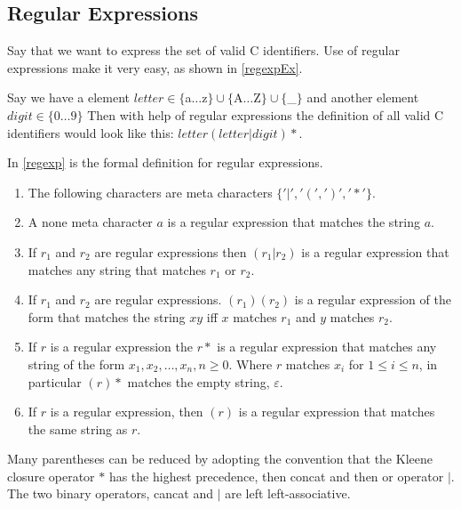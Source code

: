 \subsection{Regular Expressions}
Say that we want to express the set of valid C identifiers. Use of regular 
expressions make it very easy, as shown in \cref{regexpEx}. 
\begin{example}\label{regexpEx}
Say we have a element $letter \in \{$a$ \dots $z$\} \cup \{$A$ \dots $Z$\} \cup 
\{$\_$\}$
and another element $digit \in \{0 \dots 9\}$
Then with help of regular expressions the definition of all valid C identifiers 
would look like this: $letter (letter | digit)*$. \cite{Aho2006}
\end{example}
In \cref{regexp} is the formal definition for regular expressions.
\begin{definition}\label{regexp} \cite{Aho1990}
\newline
\begin{enumerate}
  \item The following characters are meta characters $\{ '|', '(', ')', '*' \}$.
  \item A none meta character $a$ is a regular expression that matches the 
      string $a$.
  \item If $r_1$ and $r_2$ are regular expressions then $(r_1 | r_2)$ is a 
      regular expression that matches any string that matches $r_1$ or $r_2$.
  \item If $r_1$ and $r_2$ are regular expressions. $(r_1)(r_2)$ is a regular
      expression of the form that matches the string $xy$ iff $x$ matches $r_1$
      and $y$ matches $r_2$.
  \item If $r$ is a regular expression the $r*$ is a regular expression that
      matches any string of the form $x_1, x_2, \dots , x_n, n \geq 0$.
      Where $r$ matches $x_i$ for $1 \leq i \leq n$, in particular $(r)*$ 
      matches the empty string, $\varepsilon$.
  \item If $r$ is a regular expression, then $(r)$ is a regular expression that
      matches the same string as $r$.
\end{enumerate}
\end{definition}
Many parentheses can be reduced by adopting the convention that the Kleene
closure operator $*$ has the highest precedence, then concat and then or
operator $|$. The two binary operators, cancat and $|$ are left 
left-associative. \cite{Aho1990}
